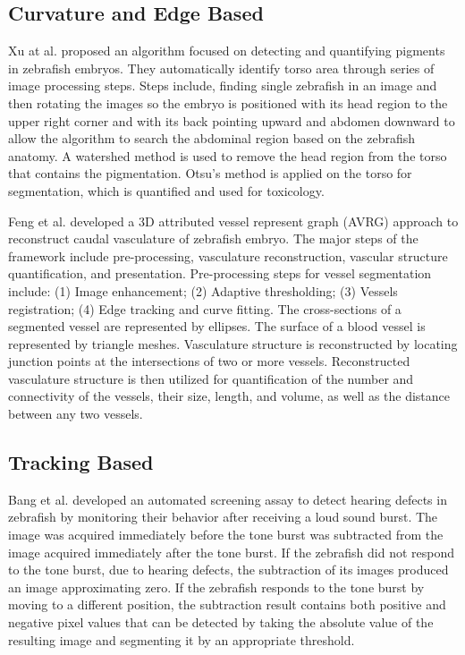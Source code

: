 \subsection{Curvature and Edge Based}

Xu at al. \cite{Xu10} proposed an algorithm focused on detecting and quantifying pigments in zebrafish embryos. They automatically identify torso area through series of image processing steps. Steps include, finding single zebrafish in an image and then rotating the images so the embryo is positioned with its head region to the upper right corner and with its back pointing upward and abdomen downward to allow the algorithm to search the abdominal region based on the zebrafish anatomy. A watershed method is used to remove the head region from the torso that contains the pigmentation. Otsu’s method is applied on the torso for segmentation, which is quantified and used for toxicology. 

Feng et al. \cite{Feng05} developed a 3D attributed vessel represent graph (AVRG) approach to reconstruct caudal vasculature of zebrafish embryo. The major steps of the framework include pre-processing, vasculature reconstruction, vascular structure quantification, and presentation. Pre-processing steps for vessel segmentation include: (1) Image enhancement; (2) Adaptive thresholding; (3) Vessels registration; (4) Edge tracking and curve fitting. The cross-sections of a segmented vessel are represented by ellipses. The surface of a blood vessel is represented by triangle meshes. Vasculature structure is reconstructed by locating junction points at the intersections of two or more vessels. Reconstructed vasculature structure is then utilized for quantification of the number and connectivity of the vessels, their size, length, and volume, as well as the distance between any two vessels.


\subsection{Tracking Based}

Bang et al. \cite{bang2002} developed an automated screening assay to detect hearing defects in zebrafish by monitoring their behavior after receiving a loud sound burst. The image was acquired immediately before the tone burst was subtracted from the image acquired immediately after the tone burst. If the zebrafish did not respond to the tone burst, due to hearing defects, the subtraction of its images produced an image approximating zero. If the zebrafish responds to the tone burst by moving to a different position, the subtraction result contains both positive and negative pixel values that can be detected by taking the absolute value of the resulting image and segmenting it by an appropriate threshold.

